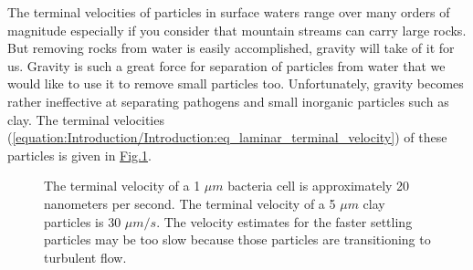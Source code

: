 \documentclass[letterpaper,10pt,english]{sphinxmanual}
\let\sphinxpxdimen\pdfpxdimen\else\newdimen\sphinxpxdimen
\begin{document}
\begin{sphinxVerbatim}[commandchars=\\\{\}]
 
\PYG{p}{[}\PYG{p}{]}
  
\end{sphinxVerbatim}

The terminal velocities of particles in surface waters range over many orders of magnitude especially if you consider that mountain streams can carry large rocks. But removing rocks from water is easily accomplished, gravity will take of it for us. Gravity is such a great force for separation of particles from water that we would like to use it to remove small particles too. Unfortunately, gravity becomes rather ineffective at separating pathogens and small inorganic particles such as clay. The terminal velocities (\eqref{equation:Introduction/Introduction:eq_laminar_terminal_velocity}) of these particles is given in \hyperref[\detokenize{Introduction/Introduction:figure-terminal-velocity}]{Fig.\@ \ref{\detokenize{Introduction/Introduction:figure-terminal-velocity}}}.

\begin{figure}[htbp]
\centering
\capstart

\noindent\sphinxincludegraphics[width=500\sphinxpxdimen]{{Terminal_velocity}.png}
\caption{The terminal velocity of a 1 \(\mu m\) bacteria cell is approximately 20 nanometers per second. The terminal velocity of a 5 \(\mu m\) clay particles is 30 \(\mu m/s\). The velocity estimates for the faster settling particles may be too slow because those particles are transitioning to turbulent flow.}\label{\detokenize{Introduction/Introduction:id19}}\label{\detokenize{Introduction/Introduction:figure-terminal-velocity}}\end{figure}
\end{document}
